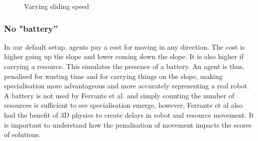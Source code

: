 \documentclass[12pt]{article}
\begin{document}
\begin{figure}[!tbp]
  \hfill
  \hfill
  
  \caption{Varying sliding speed}
  \label{fig:sliding_speed}
\end{figure}

\subsubsection{No "battery''}

In our default setup, agents pay a cost for moving in any direction. The cost is higher going up the slope and lower coming down the slope. It is also higher if carrying a resource. This simulates the presence of a battery. An agent is thus, penalised for wasting time and for carrying things on the slope, making specialisation more advantageous and more accurately representing a real robot. A battery is not used by Ferrante et al. \cite{ferrante:2015:PLoSCB} and simply counting the number of resources is sufficient to see specialisation emerge, however, Ferrante et al also had the benefit of 3D physics to create delays in robot and resource movement. It is important to understand how the penalisation of movement impacts the scores of solutions.\\
\end{document}
